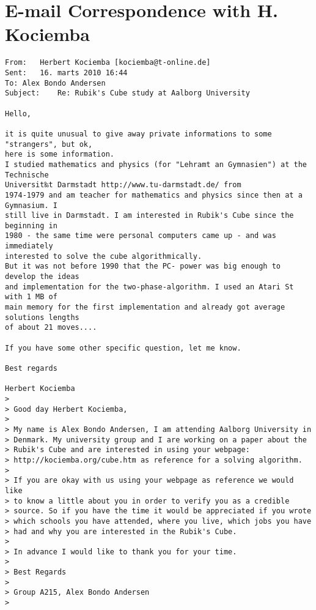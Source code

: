 \chapter{E-mail Correspondence with H. Kociemba}
\label{chap:emailCorrespondence}
\begin{verbatim}
From:	Herbert Kociemba [kociemba@t-online.de]
Sent:	16. marts 2010 16:44
To:	Alex Bondo Andersen
Subject:	Re: Rubik's Cube study at Aalborg University

Hello,

it is quite unusual to give away private informations to some "strangers", but ok, 
here is some information.
I studied mathematics and physics (for "Lehramt an Gymnasien") at the Technische 
Universit‰t Darmstadt http://www.tu-darmstadt.de/ from
1974-1979 and am teacher for mathematics and physics since then at a Gymnasium. I 
still live in Darmstadt. I am interested in Rubik's Cube since the beginning in 
1980 - the same time were personal computers came up - and was immediately 
interested to solve the cube algorithmically. 
But it was not before 1990 that the PC- power was big enough to develop the ideas 
and implementation for the two-phase-algorithm. I used an Atari St with 1 MB of 
main memory for the first implementation and already got average solutions lengths 
of about 21 moves....

If you have some other specific question, let me know.

Best regards

Herbert Kociemba
>
> Good day Herbert Kociemba,
>
> My name is Alex Bondo Andersen, I am attending Aalborg University in 
> Denmark. My university group and I are working on a paper about the 
> Rubik's Cube and are interested in using your webpage:
> http://kociemba.org/cube.htm as reference for a solving algorithm.
>
> If you are okay with us using your webpage as reference we would like 
> to know a little about you in order to verify you as a credible 
> source. So if you have the time it would be appreciated if you wrote 
> which schools you have attended, where you live, which jobs you have 
> had and why you are interested in the Rubik's Cube.
>
> In advance I would like to thank you for your time.
>
> Best Regards
>
> Group A215, Alex Bondo Andersen
>
\end{verbatim}
